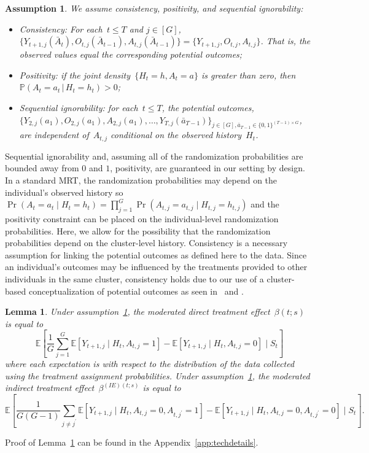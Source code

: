 \documentclass[12pt]{article}
\def\given{\, | \,}
\newtheorem{lemma}[thm]{Lemma}
\newtheorem{assumption}[thm]{Assumption}
\begin{document}
\begin{assumption} \normalfont
  \label{consistency}
  We assume consistency, positivity, and sequential ignorability:
  \begin{itemize}
  \item Consistency: For each~$t \leq T$ and $j \in [G]$,
    $\{Y_{t+1,j} (\bar{A}_{t} ), O_{t,j} (\bar A_{t-1}), A_{t,j} (\bar{A}_{t-1} )\}  = \{Y_{t+1, j}, O_{t,j}, A_{t,j}\}$.
    That is, the observed values equal the corresponding potential outcomes;
  \item Positivity: if the joint density~$\{ H_t = h, A_t = a\}$ is greater
    than zero, then~$\mathbb{P} (A_t = a_t \given H_t = h_t ) > 0$;
  \item Sequential ignorability: for each~$t \leq T$, the
    potential outcomes,\\ $\{Y_{2,j} ( a_{1}), O_{2,j}(a_{1}),A_{2,j}( a_{1}), \ldots,
    Y_{T,j} (\bar a_{T-1}) \}_{j \in [G], \bar a_{T-1}\in \{0,1\}^{(T-1)\times G}}$, are independent of~$A_{t,j}$ conditional on the observed history~$H_t$.
  \end{itemize}
\end{assumption}

Sequential ignorability and, assuming all of the randomization probabilities are bounded away from $0$ and $1$, positivity, are guaranteed in our setting  by design. In a standard MRT, the randomization probabilities may depend on the individual's observed history so $\Pr(A_t = a_t \mid H_t = h_t) = \prod_{j=1}^G \Pr(A_{t,j} = a_{t,j} \mid H_{t,j} = h_{t,j})$ and the positivity constraint can be placed on the individual-level randomization probabilities.  Here, we allow for the possibility that the randomization probabilities depend on the cluster-level history. Consistency is a necessary assumption for linking the potential outcomes as defined here to the data. Since an individual's outcomes may be influenced by the treatments provided to other individuals in the same cluster, consistency holds due to our use of a cluster-based conceptualization of potential outcomes as seen in~\cite{Hong2006} and \cite{Vanderweele2013}.

\begin{lemma}
  \label{lemma:cond_effect}
  Under assumption~\ref{consistency}, the moderated direct treatment effect~$\beta(t;s)$ is equal to
  $$
  \mathbb{E} \left[ \frac{1}{G} \sum_{j=1}^G \mathbb{E} \left[ Y_{t+1,j} \mid H_{t}, A_{t,j} = 1 \right] - \mathbb{E} \left[ Y_{t+1,j} \mid H_{t}, A_{t,j} = 0 \right] \mid S_t \right]
  $$
  where each expectation is with respect to the distribution of the
  data collected using the treatment assignment probabilities. Under assumption~\ref{consistency}, the moderated indirect treatment effect~$\beta^{(IE)(t;s)}$ is equal to
  $$
  \mathbb{E} \left[ \frac{1}{G (G-1)} \sum_{j \neq j^\prime} \mathbb{E} \left[ Y_{t+1,j} \mid H_{t}, A_{t,j} = 0, A_{t,j^\prime} = 1 \right] - \mathbb{E} \left[ Y_{t+1,j} \mid H_{t}, A_{t,j} = 0, A_{t,j^\prime} = 0 \right] \mid S_t \right].
  $$
\end{lemma}
\noindent Proof of Lemma~\ref{lemma:cond_effect} can be found in the Appendix~\ref{app:techdetails}.
\end{document}
